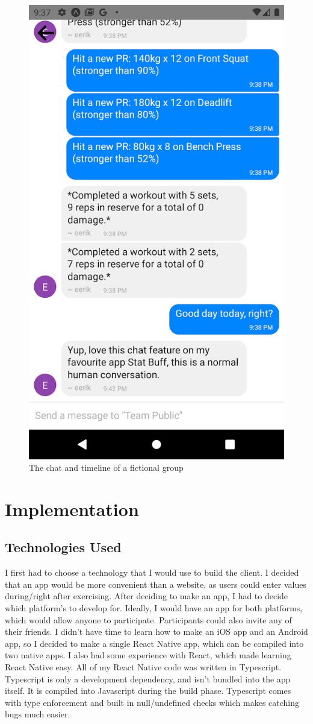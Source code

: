 \documentclass{l4proj}
\begin{document}
\begin{figure}[H]
    \centering
    \includegraphics[width=0.5\linewidth]{chat.png}    
    \caption{The chat and timeline of a fictional group}
    \label{fig:chat}
\end{figure}



\chapter{Implementation}

\section{Technologies Used}
I first had to choose a technology that I would use to build the client. I decided that an app would be more convenient than a website, as users could enter values during/right after exercising. After deciding to make an app, I had to decide which platform's to develop for. Ideally, I would have an app for both platforms, which would allow anyone to participate. Participants could also invite any of their friends. I didn't have time to learn how to make an iOS app and an Android app, so I decided to make a single React Native app, which can be compiled into two native apps. I also had some experience with React, which made learning React Native easy. All of my React Native code was written in Typescript. Typescript is only a development dependency, and isn't bundled into the app itself. It is compiled into Javascript during the build phase. Typescript comes with type enforcement and built in null/undefined checks which makes catching bugs much easier. 
\end{document}
